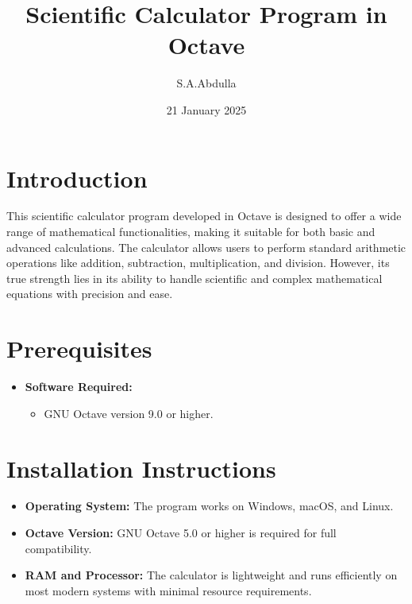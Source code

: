 \documentclass[a4paper,12pt]{article}
\title{Scientific Calculator Program in Octave}
\author{S.A.Abdulla}
\date{21 January 2025}
\begin{document}
\maketitle

\newpage
\tableofcontents
\newpage

\newpage
\section*{Introduction}

This scientific calculator program developed in Octave is designed to offer a wide range of mathematical functionalities, making it suitable for both basic and advanced calculations. The calculator allows users to perform standard arithmetic operations like addition, subtraction, multiplication, and division. However, its true strength lies in its ability to handle scientific and complex mathematical equations with precision and ease.

\section*{Prerequisites}

\begin{itemize}
    \item \textbf{Software Required:}
    \begin{itemize}
        \item GNU Octave version 9.0 or higher.
    \end{itemize}
\end{itemize}

\section*{Installation Instructions}

\begin{itemize}
    \item \textbf{Operating System:} The program works on Windows, macOS, and Linux.
    \item \textbf{Octave Version:} GNU Octave 5.0 or higher is required for full compatibility.
    \item \textbf{RAM and Processor:} The calculator is lightweight and runs efficiently on most modern systems with minimal resource requirements.
\end{itemize}
\end{document}
